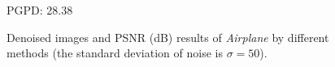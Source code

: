 \begin{figure}[t!]
{\begin{minipage}[t]{0.24\textwidth}
{\footnotesize PGPD: 28.38}
\end{minipage}
}\vspace{-3mm}
    \caption{Denoised images and PSNR (dB) results of \textsl{Airplane} by different methods (the standard deviation of noise is $\sigma=50$).}
    \label{fig2-12}
\end{figure}


\begin{figure}[ht!]
    \centering
{}
\end{figure}
